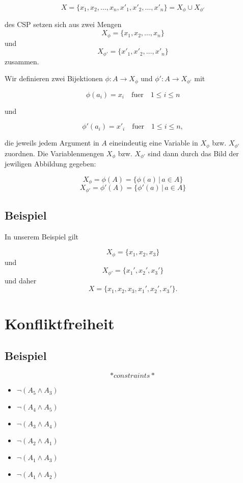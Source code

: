 \documentclass[]{article}
\begin{document}
\[ X  = \{x_1,x_2,\dots,x_n,x'_1,x'_2,\dots,x'_n\} = X_{\phi} \cup X_{\phi'} \]

des CSP setzen sich aus zwei Mengen \[X_{\phi} = \{x_1,x_2,\dots,x_n\}
\] und \[X_{\phi'} = \{x'_1,x'_2,\dots,x'_n\} \] zusammen.

Wir definieren zwei Bijektionen $\phi \colon A \to X_{\phi}$ und
$\phi' \colon A \to X_{\phi'}$ mit

\[ \phi(a_i) = x_i \quad \text{fuer} \quad 1 \leq i \leq  n \]

und

\[ \phi'(a_i) = x'_i \quad \text{fuer} \quad 1 \leq i \leq  n,\]

die jeweils jedem Argument in $A$ eineindeutig eine Variable in
$X_{\phi}$ bzw. $X_{\phi'}$ zuordnen. Die Variablenmengen $X_{\phi}$
bzw. $X_{\phi'}$ sind dann durch das Bild der jewiligen Abbildung
gegeben:

\[ X_{\phi}  = \phi(A) = \{ \phi(a) \,|\, a \in A \} \]
\[ X_{\phi'}  = \phi'(A) = \{ \phi'(a) \,|\, a \in A \} \]

\subsection{Beispiel}\label{beispiel-1}

In unserem Beispiel gilt

\[ X_{\phi} = \{x_1,x_2,x_3\} \] und \[ X_{\phi'} = \{x_1',x_2',x_3'\}\]
und daher \[ X = \{x_1,x_2,x_3,x_1',x_2',x_3'\}.\]

\section{Konfliktfreiheit}\label{konfliktfreiheit}

\subsection{Beispiel}\label{beispiel-2}

\[*constraints*\]

\begin{itemize}
\itemsep1pt\parskip0pt
\item
  $\lnot ( A_5 \land A_3 ) $
\item
  $\lnot ( A_4 \land A_5 ) $
\item
  $\lnot ( A_3 \land A_4 ) $
\item
  $\lnot ( A_2 \land A_1 ) $
\item
  $\lnot ( A_1 \land A_3 ) $
\item
  $\lnot ( A_1 \land A_2 ) $
\end{itemize}
\end{document}
